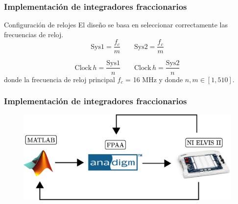 \documentclass[10pt]{beamer}
\begin{document}
	\begin{frame}
		\frametitle{Implementación de integradores fraccionarios}
		\begin{block}{Configuración de relojes}
		El diseño se basa en seleccionar correctamente las frecuencias de reloj.
		\begin{equation}
			\mathrm{Sys1} = \frac{f_{c}}{m} \qquad \mathrm{Sys2} = \frac{f_{c}}{m}
			\label{ec:sys_clock}
		\end{equation}
		
		\begin{equation}
		\mathrm{Clock\,} h = \frac{\mathrm{Sys1}}{n}	\qquad   \mathrm{Clock\,} h = \frac{\mathrm{Sys2}}{n}
		\label{ec:clock_h}
		\end{equation}
		\justifying
		donde la frecuencia de reloj principal $f_{c}$ = 16 MHz y donde $n,m\in[1,510]$.
		\end{block}
	\end{frame}
	\begin{frame}
		\frametitle{Implementación de integradores fraccionarios}
		\begin{figure}[hbtp]
			\centering
			\includegraphics[width = 12cm]{descripcion.eps}
		\end{figure}
	\end{frame}
\end{document}
